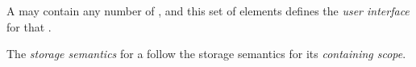 A  may contain any number of , and this set of elements defines the \textit{user interface} for that .

The \textit{storage semantics} for a  follow the storage semantics for its \textit{containing scope}.